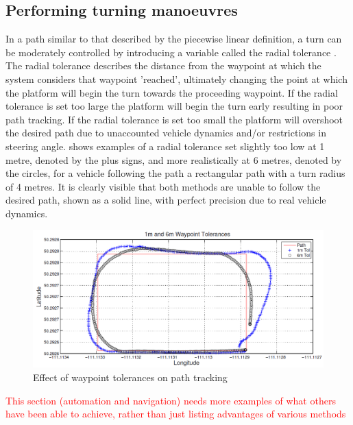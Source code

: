 \documentclass[main.tex]{subfiles}
\begin{document}
\subsection{Performing turning manoeuvres}
In a path similar to that described by the piecewise linear definition, a turn can be moderately controlled by introducing a variable called the radial tolerance \parencite{Giesbrecht2005}. The radial tolerance describes the distance from the waypoint at which the system considers that waypoint 'reached', ultimately changing the point at which the platform will begin the turn towards the proceeding waypoint. If the radial tolerance is set too large the platform will begin the turn early resulting in poor path tracking. If the radial tolerance is set too small the platform will overshoot the desired path due to unaccounted vehicle dynamics and/or restrictions in steering angle.  shows examples of a radial tolerance set slightly too low at 1 metre, denoted by the plus signs, and more realistically at 6 metres, denoted by the circles, for a vehicle following the path a rectangular path with a turn radius of 4 metres. It is clearly visible that both methods are unable to follow the desired path, shown as a solid line, with perfect precision due to real vehicle dynamics.
\begin{figure}[ht]
\includegraphics[width=\textwidth]{2-LiteratureReview/waypointTolerances.PNG}
\centering
\caption[Effect of waypoint tolerances on path tracking]{Effect of waypoint tolerances on path tracking \parencite{Giesbrecht2005}} 
\end{figure}

\textcolor{red}{This section (automation and navigation) needs more examples of what others have been able to achieve, rather than just listing advantages of various methods}
\end{document}
